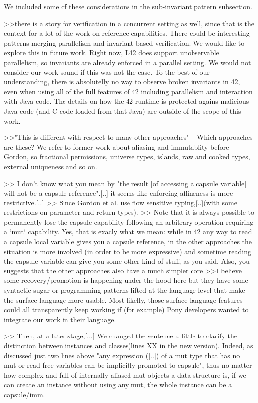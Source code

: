 We included some of these considerations in the sub-invariant pattern subsection.


>>there is a story for verification in a concurrent setting as well, since that is  the context for a lot of the work on reference capabilities.
There could be interesting patterns merging parallelism and invariant based verification. We would like to explore this in future work.
Right now, L42 does support unobservable parallelism, so invariants are already enforced in a parallel setting.
We would not consider our work sound if this was not the case. To the best of our understanding, there is absolutelly no way 
to observe broken invariants in 42, even when using all of the full features of 42 including parallelism and interaction with Java code.
The details on how the 42 runtime is protected agains malicious Java code (and C code loaded from that Java) are outside of the scope of this work.

>>"This is different with respect to many other approaches"  -- Which approaches are these? 
We refer to former work about aliasing and immutablity before Gordon, so fractional permissions, universe types, islands, raw and cooked types, external uniqueness and so on.


>> I don't know what you mean by "the result [of accessing a capsule variable] will not be a capsule reference".[..] it seems like enforcing affineness is more restrictive.[..]
>>  Since Gordon et al. use flow sensitive typing,[..](with some restrictions on parameter and return types).
>>  Note that it is always possible to permanently lose the capsule  capability following an arbitrary operation requiring a `mut` capability.
Yes, that is exacly what we mean: while in 42 any way to read a capsule local variable gives you a capsule reference, in the other approaches the situation is more involved
 (in order to be more expressive) and sometime reading the capsule variable can give you some other kind of stuff, as you said.
Also, you suggests that the other approaches also have a much simpler core 
>>I believe some recovery/promotion is happening under the hood here
but they have some syntactic sugar or programming patterns lifted at the language level that make the surface language more usable.
Most likelly, those surface language features could all transparently keep working if (for example) Pony developers wanted to integrate our work in their language.


>> Then, at a later stage,[...]
We changed the sentence a little to clarify the distinction between instances and classes(lines XX in the new version). Indeed, as discussed just two lines above
"any expression ([..]) of a mut type that has no mut or read free variables can be implicitly promoted to capsule",
thus no matter how complex and full of internally aliased mut objects a data structure is, if we can create an instance without using any mut, the whole instance can be a capsule/imm.


